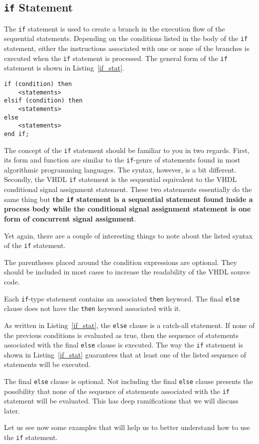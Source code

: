 \subsection{\texttt{if} Statement}
The \texttt{if} statement is used to create a branch in the execution flow of the sequential statements. Depending on the conditions listed in the body of the \texttt{if} statement, either the instructions associated with one or none of the branches is executed when the \texttt{if} statement is processed. The general form of the \texttt{if} statement is shown in Listing~\ref{if_stat}.

\noindent
\begin{minipage}{0.99\linewidth}
\begin{lstlisting}[label=if_stat, caption=Syntax of the \texttt{if} statement.]
if (condition) then
	<statements>
elsif (condition) then
	<statements>
else
	<statements>
end if;
\end{lstlisting}
\end{minipage}

The concept of the \texttt{if} statement should be familiar to you in two regards. First, its form and function are similar to the \texttt{if}-genre of statements found in most algorithmic programming languages. The syntax, however, is a bit different. Secondly, the VHDL \texttt{if} statement is the sequential equivalent to the VHDL conditional signal assignment statement. These two statements essentially do the same thing but \textbf{the \texttt{if} statement is a sequential statement found inside a process body while the conditional signal assignment statement is one form of concurrent signal assignment}.

Yet again, there are a couple of interesting things to note about the listed syntax of the \texttt{if} statement.
\begin{my_list}
\item The parentheses placed around the condition expressions are optional. They should be included in most cases to increase the readability of the VHDL source code.
\item Each \texttt{if}-type statement contains an associated \texttt{then} keyword. The final \texttt{else} clause does not have the \texttt{then} keyword associated with it.
\item As written in Listing~\ref{if_stat}, the \texttt{else} clause is a catch-all statement. If none of the previous conditions is evaluated as true, then the sequence of statements associated with the final \texttt{else} clause is executed. The way the \texttt{if} statement is shown in Listing~\ref{if_stat} guarantees that at least one of the listed sequence of statements will be executed.
\item The final \texttt{else} clause is optional. Not including the final \texttt{else} clause presents the possibility that none of the sequence of statements associated with the \texttt{if} statement will be evaluated. This has deep ramifications that we will discuss later.
\end{my_list}
Let us see now some examples that will help us to better understand how to use the \texttt{if} statement.

